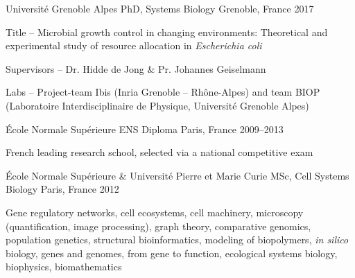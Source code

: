 

\begin{cventries}

\cventry
    {Université Grenoble Alpes} %
    {PhD, Systems Biology} %
    {Grenoble, France} %
    {2017} %
    {
      \begin{cvitems} %
			\item Title -- Microbial growth control in changing environments: Theoretical and experimental study of resource allocation in \textit{Escherichia coli}
			\item Supervisors -- Dr. Hidde de Jong \& Pr. Johannes Geiselmann
			\item Labs -- Project-team Ibis (Inria Grenoble – Rhône-Alpes) and team BIOP (Laboratoire Interdisciplinaire de Physique, Université Grenoble Alpes)
      \end{cvitems}
    }
    
\cventry
    {École Normale Supérieure} %
    {ENS Diploma} %
    {Paris, France} %
    {2009--2013} %
    {
      \begin{cvitems} %
			\item French leading research school, selected via a national competitive exam
      \end{cvitems}
    }
    
\cventry
    {École Normale Supérieure \& Université Pierre et Marie Curie} %
    {MSc, Cell Systems Biology} %
    {Paris, France} %
    {2012} %
    {
      \begin{cvitems} %
			\item Gene regulatory networks, cell ecosystems, cell machinery, microscopy (quantification, image processing), graph theory, comparative genomics, population genetics, structural bioinformatics, modeling of biopolymers, \textit{in silico} biology, genes and genomes, from gene to function, ecological systems biology, biophysics, biomathematics
      \end{cvitems}
    }
    

\end{cventries}
